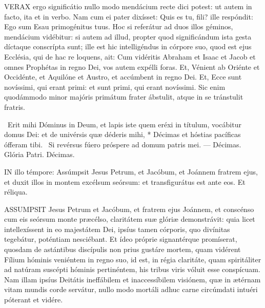 
\lettrine[lines=2]{V}{ERAX} ergo significátio nullo modo mendácium recte dici potest: ut autem in facto, ita et in verbo. Nam cum ei pater dixísset: Quis es tu, fili? ille respóndit: Ego sum Esau primogénitus tuus. Hoc si referátur ad duos illos géminos, mendácium vidébitur: si autem ad illud, propter quod significándum ista gesta díctaque conscrípta sunt; ille est hic intelligéndus in córpore suo, quod est ejus Ecclésia, qui de hac re loquens, ait: Cum vidéritis Abraham et Isaac et Jacob et omnes Prophétas in regno Dei, vos autem expélli foras. Et, Vénient ab Oriénte et Occidénte, et Aquilóne et Austro, et accúmbent in regno Dei. Et, Ecce sunt novíssimi, qui erant primi: et sunt primi, qui erant novíssimi. Sic enim quodámmodo minor majóris primátum frater ábstulit, atque in se tránstulit fratris.

\R\ Erit mihi Dóminus in Deum, et lapis iste quem eréxi in títulum, vocábitur domus Dei: et de univérsis quæ déderis mihi, * Décimas et hóstias pacíficas ófferam tibi. \V\ Si revérsus fúero próspere ad domum patris mei. --- Décimas. Glória Patri. Décimas.




\lettrine[lines=2]{I}{N} illo témpore: Assúmpsit Jesus Petrum, et Jacóbum, et Joánnem fratrem ejus, et duxit illos in montem excélsum seórsum: et transfigurátus est ante eos. Et réliqua.



\lettrine[lines=2]{A}{SSUMPSIT} Jesus Petrum et Jacóbum, et fratrem ejus Joánnem, et conscénso cum eis seórsum monte præcélso, claritátem suæ glóriæ demonstrávit: quia licet intellexíssent in eo majestátem Dei, ipsíus tamen córporis, quo divínitas tegebátur, poténtiam nesciébant. Et ídeo próprie signantérque promíserat, quosdam de astántibus discípulis non prius gustáre mortem, quam vidérent Fílium hóminis veniéntem in regno suo, id est, in régia claritáte, quam spiritáliter ad natúram suscépti hóminis pertinéntem, his tribus viris vóluit esse conspícuam. Nam illam ipsíus Deitátis ineffábilem et inaccessíbilem visiónem, quæ in ætérnam vitam mundis corde servátur, nullo modo mortáli adhuc carne circúmdati intuéri póterant et vidére.

